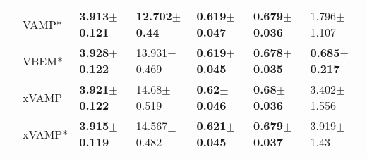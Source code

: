 \begin{tabular}{lllllll}
             & VAMP* &  \textbf{3.913$\pm$0.121} &   \textbf{12.702$\pm$0.44} &  \textbf{0.619$\pm$0.047} &  \textbf{0.679$\pm$0.036} &           1.796$\pm$1.107 \\
             & VBEM* &  \textbf{3.928$\pm$0.122} &           13.931$\pm$0.469 &  \textbf{0.619$\pm$0.045} &  \textbf{0.678$\pm$0.035} &  \textbf{0.685$\pm$0.217} \\
             & xVAMP &  \textbf{3.921$\pm$0.122} &            14.68$\pm$0.519 &   \textbf{0.62$\pm$0.046} &   \textbf{0.68$\pm$0.036} &           3.402$\pm$1.556 \\
             & xVAMP* &  \textbf{3.915$\pm$0.119} &           14.567$\pm$0.482 &  \textbf{0.621$\pm$0.045} &  \textbf{0.679$\pm$0.037} &            3.919$\pm$1.43 \\
\bottomrule
\end{tabular}

